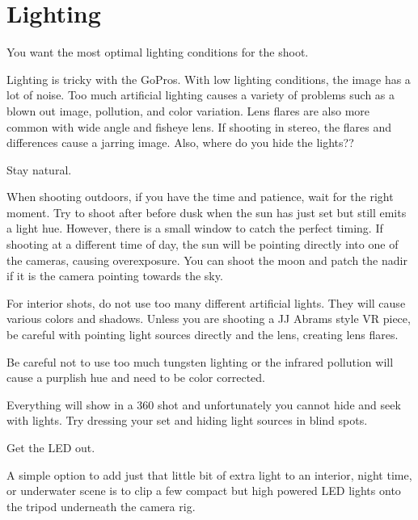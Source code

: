 \chapter{Lighting}
\pagecolor{white}
\label{chap:25}
\begin{fullwidth}


\problem

{\large You want the most optimal lighting conditions for the shoot. \par}

Lighting is tricky with the GoPros. With low lighting conditions, the image has a lot of noise. Too much artificial lighting causes a variety of problems such as a blown out image, pollution, and color variation. Lens flares are also more common with wide angle and fisheye lens. If shooting in stereo, the flares and differences cause a jarring image. Also, where do you hide the lights??

\solution

{\large Stay natural. \par}

When shooting outdoors, if you have the time and patience, wait for the right moment. Try to shoot after before dusk when the sun has just set but still emits a light hue. However, there is a small window to catch the perfect timing. If shooting at a different time of day, the sun will be pointing directly into one of the cameras, causing overexposure. You can shoot the moon and patch the nadir if it is the camera pointing towards the sky. 

For interior shots, do not use too many different artificial lights. They will cause various colors and shadows. Unless you are shooting a JJ Abrams style VR piece, be careful with pointing light sources directly and the lens, creating lens flares.

Be careful not to use too much tungsten lighting or the infrared pollution will cause a purplish hue and need to be color corrected. 

Everything will show in a 360 shot and unfortunately you cannot hide and seek with lights. Try dressing your set and hiding light sources in blind spots. 


{\large Get the LED out. \par}

A simple option to add just that little bit of extra light to an interior, night time, or underwater scene is to clip a few compact but high powered LED lights onto the tripod underneath the camera rig.


\end{fullwidth}
